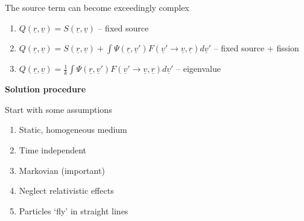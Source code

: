 \documentclass[aspectratio=1610,pdftex,dvipsnames,compress,xcolor={dvipsnames}]{beamer}
\begin{document}
\begin{frame}{The source term can become exceedingly complex}
    \begin{enumerate}[series=outerlist,topsep=0pt,itemsep=21pt,leftmargin=*,label=(\arabic*)]
        \item[]$Q(\underline{r},\underline{v}) = S(\underline{r},\underline{v})$ -- fixed source
        \item[]$Q(\underline{r},\underline{v})= S(\underline{r},\underline{v}) + \int \Psi(\underline{r},\underline{v}') F(\underline{v}' \rightarrow \underline{v},\underline{r}) d\underline{v}'$ -- fixed source + fission
        \item[]$Q(\underline{r},\underline{v}) = \frac{1}{k} \int \Psi(\underline{r},\underline{v}') F(\underline{v}' \rightarrow \underline{v},\underline{r}) d\underline{v}'$ -- eigenvalue
    \end{enumerate}
\end{frame}


\begin{frame}[plain]{}
    \centering\LARGE\textbf{Solution procedure}
\end{frame}


\addtocounter{framenumber}{-1} 
\begin{frame}{Start with some assumptions}
    \begin{enumerate}[series=outerlist,topsep=0pt,itemsep=21pt,leftmargin=*,label=(\arabic*)]
        \item[]Static, homogeneous medium
        \item[]Time independent
        \item[]Markovian (important)
        \item[]Neglect relativistic effects
        \item[]Particles `fly' in straight lines
    \end{enumerate}
\end{frame}
\end{document}
